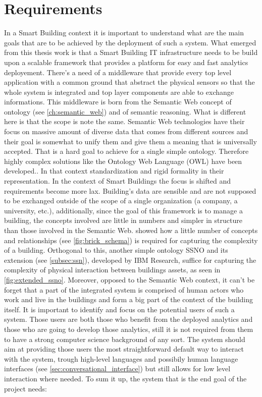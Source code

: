 \section{Requirements} \label{sec:requirements}
In a Smart Building context it is important to understand what are the main goals that are to be achieved by the deployment of such a system. What emerged from this thesis work is that a Smart Building IT infrastructure needs to be build upon a scalable framework that provides a platform for easy and fast analytics deployement. There's a need of a middleware that provide every top level application with a common ground that abstract the physical sensors so that the whole system is integrated and top layer components are able to exchange informations. This middleware is born from the Semantic Web concept of ontology (see \autoref{ch:semantic_web}) and of semantic reasoning. What is different here is that the scope is note the same. Semantic Web technologies have their focus on massive amount of diverse data that comes from different sources and their goal is somewhat to unify them and give them a meaning that is universally accepted. That is a hard goal to achieve for a single simple ontology. Therefore highly complex solutions like the Ontology Web Language (OWL)\cite{owl_reccomendation} have been developed.. In that context standardization and rigid formality in their representation. In the context of Smart Buildings the focus is shifted and requirements become more lax.
Building's data are sensible and are not supposed to be exchanged outside of the scope of a single organization (a company, a university, etc.), additionally, since the goal of this framework is to manage a building, the concepts involved are little in numbers and simpler in structure than those involved in the Semantic Web. \textcite{brick_schema} showed how a little number of concepts and relationships (see \autoref{fig:brick_schema}) is required for capturing the complexity of a building. Orthogonal to this, another simple ontology SSNO and its extension (see \autoref{subsec:ssn}), developed by IBM Research, suffice for capturing the complexity of physical interaction between buildings assets, as seen in \autoref{fig:extended_ssno}.
Moreover, opposed to the Semantic Web context, it can't be forget that a part of the integrated system is comprised of human actors who work and live in the buildings and form a big part of the context of the building itself. It is important to identify and focus on the potential users of such a system. Those users are both those who benefit from the deployed analytics and those who are going to develop those analytics, still it is not required from them to have a strong computer science background of any sort. The system should aim at providing those users the most straightforward default way to interact with the system, trough high-level languages and possibily human language interfaces (see \autoref{sec:conversational_interface}) but still allows for low level interaction where needed. To sum it up, the system that is the end goal of the project needs:
